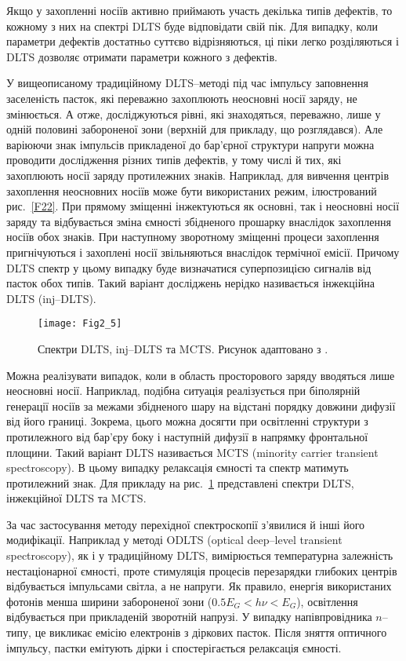 Якщо у захопленні носіїв активно приймають участь декілька типів дефектів, то кожному
з них на спектрі DLTS буде відповідати свій пік.
Для випадку, коли параметри дефектів достатньо суттєво відрізняються, ці піки легко розділяються
і DLTS дозволяє отримати параметри кожного з дефектів.


У вищеописаному традиційному DLTS--методі під час імпульсу заповнення заселеність пасток,
які переважно захоплюють неосновні носії заряду, не змінюється.
А отже, досліджуються рівні, які знаходяться, переважно, лише у одній половині  забороненої зони
(верхній для прикладу, що розглядався).
Але варіюючи знак імпульсів прикладеної до бар'єрної структури напруги можна
проводити дослідження різних типів дефектів, у тому числі й тих, які захоплюють носії заряду протилежних знаків.
Наприклад, для вивчення центрів захоплення неосновних носіїв може бути використаних режим,
ілюстрований рис.~\ref{F22}.
При прямому зміщенні інжектуються як основні, так і неосновні носії заряду та
відбувається зміна ємності збідненого прошарку внаслідок захоплення носіїв
обох знаків.
При наступному зворотному зміщенні процеси захоплення пригнічуються і
захоплені носії звільняються внаслідок термічної емісії.
Причому DLTS спектр у цьому випадку буде визначатися суперпозицією сигналів
від пасток обох типів.
Такий варіант досліджень нерідко називається інжекційна DLTS (inj--DLTS).

\begin{figure}[!b]
\center
\vspace{-5mm}
\texttt{[image: Fig2\_5]}
\vspace{-3mm}
\caption{Спектри DLTS, inj--DLTS та MCTS.
Рисунок адаптовано з \cite{tuomisto2019}.
}
\vspace{-3mm}
\label{F25}
\end{figure}

Можна реалізувати випадок, коли в область просторового заряду вводяться лише неосновні носії.
Наприклад, подібна ситуація реалізується  при біполярній генерації носіїв за межами збідненого шару
на відстані порядку довжини дифузії від його границі.
Зокрема, цього можна досягти при освітленні структури з протилежного від бар'єру боку
і наступній дифузії в напрямку фронтальної площини.
Такий варіант DLTS називається MCTS (minority carrier transient spectroscopy).
В цьому випадку релаксація ємності та спектр матимуть протилежний знак.
Для прикладу на рис.~\ref{F25} представлені спектри DLTS, інжекційної DLTS та MCTS.


За час застосування методу перехідної спектроскопії з'явилися й інші його модифікації.
Наприклад у методі ODLTS (optical deep--level transient spectroscopy), як і у традиційному DLTS,
вимірюється температурна залежність нестаціонарної ємності, проте стимуляція
процесів перезарядки глибоких центрів відбувається імпульсами світла, а не напруги.
Як правило, енергія використаних фотонів менша ширини забороненої
зони ($0.5E_G<h\nu<E_G$),
освітлення відбувається при прикладеній зворотній напрузі.
У випадку напівпровідника $n$--типу, це викликає емісію електронів
з діркових пасток.
Після зняття оптичного імпульсу, пастки емітують дірки і спостерігається релаксація ємності.

